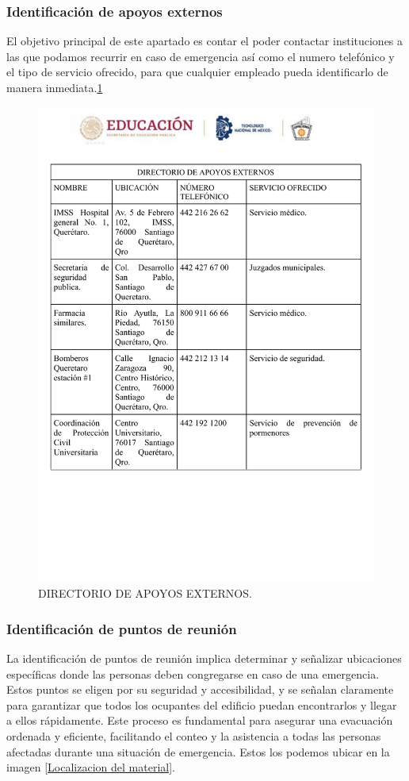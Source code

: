    \subsubsection{ Identificación de apoyos externos}
    El objetivo principal de este apartado es contar el poder contactar instituciones a las que podamos recurrir en caso de emergencia así como el numero telefónico y el tipo de servicio ofrecido, para que cualquier empleado pueda identificarlo de manera inmediata.\ref{Apoyos externos}
    \begin{figure}
        \centering
    \includegraphics[trim = {0mm 50mm 0mm 0mm},clip,scale=0.3]{24/Img/directoriodeApoyosexternos.pdf}
        \caption{DIRECTORIO DE APOYOS EXTERNOS.}
        \label{Apoyos externos}
    \end{figure}
    \subsubsection{Identificación de puntos de reunión}
    La identificación de puntos de reunión implica determinar y señalizar ubicaciones específicas donde las personas deben congregarse en caso de una emergencia. Estos puntos se eligen por su seguridad y accesibilidad, y se señalan claramente para garantizar que todos los ocupantes del edificio puedan encontrarlos y llegar a ellos rápidamente. Este proceso es fundamental para asegurar una evacuación ordenada y eficiente, facilitando el conteo y la asistencia a todas las personas afectadas durante una situación de emergencia. Estos los podemos ubicar en la imagen \ref{Localizacion del material}. 
